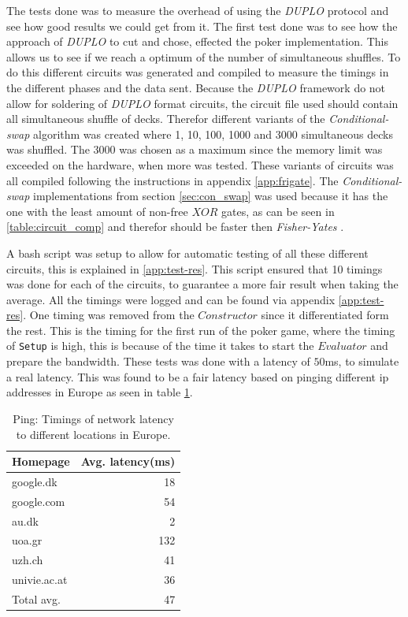 \documentclass[twoside,11pt,openright]{report}
\newcommand{\FY}{\textit{Fisher-Yates} }
\newcommand{\CS}{\textit{Conditional-swap} }
\newcommand{\DUPLO}{\textit{DUPLO} }
\begin{document}
The tests done was to measure the overhead of using the \DUPLO protocol and see how good results we could get from it. The first test done was to see how the approach of \DUPLO to cut and chose, effected the poker implementation. This allows us to see if we reach a optimum of the number of simultaneous shuffles. To do this different circuits was generated and compiled to measure the timings in the different phases and the data sent. Because the \DUPLO framework do not allow for soldering of \DUPLO format circuits, the circuit file used should contain all simultaneous shuffle of decks. Therefor different variants of the \CS algorithm was created where 1, 10, 100, 1000 and 3000 simultaneous decks was shuffled. The 3000 was chosen as a maximum since the memory limit was exceeded on the hardware, when more was tested. These variants of circuits was all compiled following the instructions in appendix \ref{app:frigate}. The \CS implementations from section \ref{sec:con_swap} was used because it has the one with the least amount of non-free $XOR$ gates, as can be seen in \ref{table:circuit_comp} and therefor should be faster then \FY.

A bash script was setup to allow for automatic testing of all these different circuits, this is explained in \ref{app:test-res}. This script ensured that 10 timings was done for each of the circuits, to guarantee a more fair result when taking the average. All the timings were logged and can be found via appendix \ref{app:test-res}. One timing was removed from the $Constructor$ since it differentiated form the rest. This is the timing for the first run of the poker game, where the timing of \verb|Setup| is high, this is because of the time it takes to start the $Evaluator$ and prepare the bandwidth. These tests was done with a latency of $50$ms, to simulate a real latency. This was found to be a fair latency based on pinging different ip addresses in Europe as seen in table \ref{table:ping}. 

\begin{table}[t]
\centering
\begin{tabular}{l || r}
Homepage & Avg. latency(ms)    \\
\hline
google.dk    &  18    \\
google.com   &  54    \\
au.dk        &   2    \\
uoa.gr       & 132    \\
uzh.ch       &  41    \\
univie.ac.at &  36    \\
\hline
Total avg.   &  47
\end{tabular}
\caption{Ping: Timings of network latency to different locations in Europe.}
\label{table:ping}
\end{table}
\end{document}

